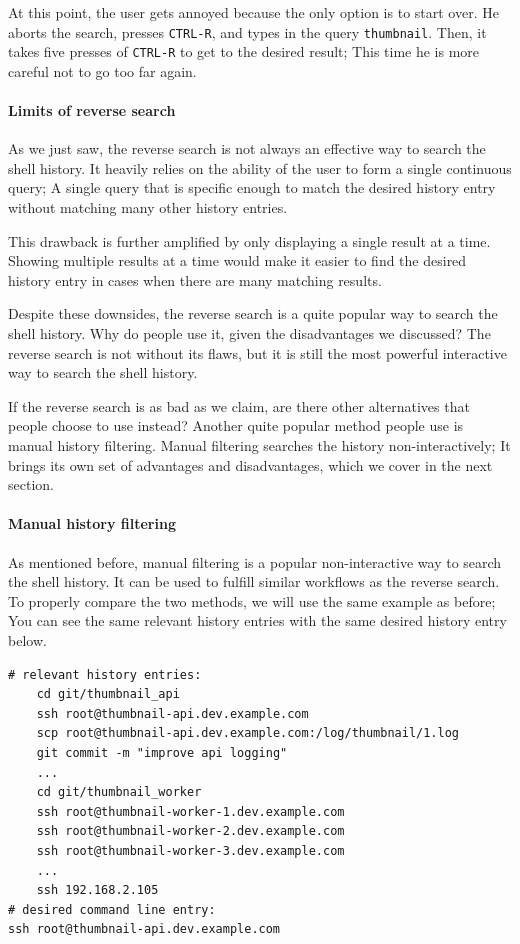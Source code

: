 At this point, the user gets annoyed because the only option is to start over. He aborts the search, presses \verb|CTRL-R|, and types in the query \verb|thumbnail|. Then, it takes five presses of \verb|CTRL-R| to get to the desired result; This time he is more careful not to go too far again.


\paragraph{Limits of reverse search}

As we just saw, the reverse search is not always an effective way to search the shell history. It heavily relies on the ability of the user to form a single continuous query; A single query that is specific enough to match the desired history entry without matching many other history entries. 

This drawback is further amplified by only displaying a single result at a time. Showing multiple results at a time would make it easier to find the desired history entry in cases when there are many matching results. 

Despite these downsides, the reverse search is a quite popular way to search the shell history. Why do people use it, given the disadvantages we discussed? The reverse search is not without its flaws, but it is still the most powerful interactive way to search the shell history. %

If the reverse search is as bad as we claim, are there other alternatives that people choose to use instead? Another quite popular method people use is manual history filtering. Manual filtering searches the history non-interactively; It brings its own set of advantages and disadvantages, which we cover in the next section.


\paragraph{Manual history filtering}

As mentioned before, manual filtering is a popular non-interactive way to search the shell history. It can be used to fulfill similar workflows as the reverse search. To properly compare the two methods, we will use the same example as before; You can see the same relevant history entries with the same desired history entry below.


\begin{verbatim}
# relevant history entries:
    cd git/thumbnail_api
    ssh root@thumbnail-api.dev.example.com
    scp root@thumbnail-api.dev.example.com:/log/thumbnail/1.log
    git commit -m "improve api logging"
    ...
    cd git/thumbnail_worker
    ssh root@thumbnail-worker-1.dev.example.com
    ssh root@thumbnail-worker-2.dev.example.com
    ssh root@thumbnail-worker-3.dev.example.com
    ...
    ssh 192.168.2.105
# desired command line entry:
ssh root@thumbnail-api.dev.example.com
\end{verbatim}

